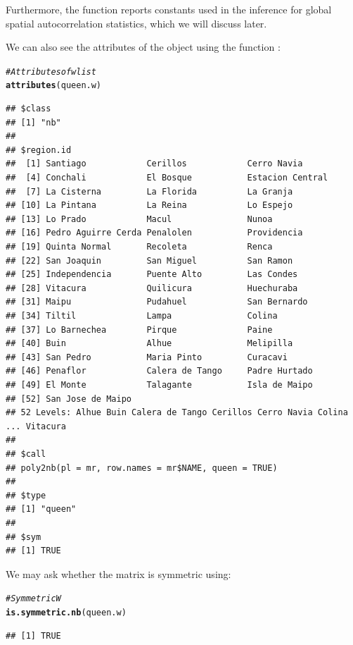 \documentclass[english,12pt]{book}\usepackage[]{graphicx}\usepackage[]{xcolor}
\makeatletter
\newcommand{\hlcom}[1]{\textcolor[rgb]{0.678,0.584,0.686}{\textit{#1}}}%
\newcommand{\hlstd}[1]{\textcolor[rgb]{0.345,0.345,0.345}{#1}}%
\newcommand{\hlkwd}[1]{\textcolor[rgb]{0.737,0.353,0.396}{\textbf{#1}}}%
\newenvironment{kframe}{%
 \def\at@end@of@kframe{}%
 \ifinner\ifhmode%
  \def\at@end@of@kframe{\end{minipage}}%
  \begin{minipage}{\columnwidth}%
 \fi\fi%
 \def\FrameCommand##1{\hskip\@totalleftmargin \hskip-\fboxsep
 \colorbox{shadecolor}{##1}\hskip-\fboxsep
     \hskip-\linewidth \hskip-\@totalleftmargin \hskip\columnwidth}%
 \MakeFramed {\advance\hsize-\width
   \@totalleftmargin\z@ \linewidth\hsize
   \@setminipage}}%
 {\par\unskip\endMakeFramed%
 \at@end@of@kframe}
\newenvironment{knitrout}{}{} %
\makeatother
\begin{document}
Furthermore, the  function reports constants used in the inference for global spatial autocorrelation statistics, which we will discuss later. 

We can also see the attributes of the object using the function :


\begin{knitrout}
\color{fgcolor}\begin{kframe}
\begin{alltt}
\hlcom{# Attributes of wlist}
\hlkwd{attributes}\hlstd{(queen.w)}
\end{alltt}
\begin{verbatim}
## $class
## [1] "nb"
## 
## $region.id
##  [1] Santiago            Cerillos            Cerro Navia        
##  [4] Conchali            El Bosque           Estacion Central   
##  [7] La Cisterna         La Florida          La Granja          
## [10] La Pintana          La Reina            Lo Espejo          
## [13] Lo Prado            Macul               Nunoa              
## [16] Pedro Aguirre Cerda Penalolen           Providencia        
## [19] Quinta Normal       Recoleta            Renca              
## [22] San Joaquin         San Miguel          San Ramon          
## [25] Independencia       Puente Alto         Las Condes         
## [28] Vitacura            Quilicura           Huechuraba         
## [31] Maipu               Pudahuel            San Bernardo       
## [34] Tiltil              Lampa               Colina             
## [37] Lo Barnechea        Pirque              Paine              
## [40] Buin                Alhue               Melipilla          
## [43] San Pedro           Maria Pinto         Curacavi           
## [46] Penaflor            Calera de Tango     Padre Hurtado      
## [49] El Monte            Talagante           Isla de Maipo      
## [52] San Jose de Maipo  
## 52 Levels: Alhue Buin Calera de Tango Cerillos Cerro Navia Colina ... Vitacura
## 
## $call
## poly2nb(pl = mr, row.names = mr$NAME, queen = TRUE)
## 
## $type
## [1] "queen"
## 
## $sym
## [1] TRUE
\end{verbatim}
\end{kframe}
\end{knitrout}

We may ask whether the matrix is symmetric using:

\begin{knitrout}
\color{fgcolor}\begin{kframe}
\begin{alltt}
\hlcom{# Symmetric W}
\hlkwd{is.symmetric.nb}\hlstd{(queen.w)}
\end{alltt}
\begin{verbatim}
## [1] TRUE
\end{verbatim}
\end{kframe}
\end{knitrout}
\end{document}
